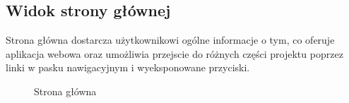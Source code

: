 \documentclass[shortabstract]{iithesis}
\begin{document}
\subsection{Widok strony głównej}
Strona główna dostarcza użytkownikowi ogólne informacje o tym, co oferuje aplikacja webowa oraz umożliwia przejscie do różnych części projektu poprzez linki w pasku nawigacyjnym i wyeksponowane przyciski.

\begin{figure}[H]
    \centering
    \hfill
    \caption{Strona główna}
\end{figure}
\end{document}
